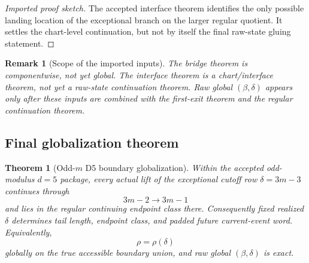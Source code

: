 \documentclass[11pt]{article}
\newtheorem{theorem}{Theorem}
\newtheorem{remark}{Remark}
\begin{document}
\begin{proof}[Imported proof sketch]
The accepted interface theorem identifies the only possible landing location of the exceptional branch on the larger regular quotient.
It settles the chart-level continuation, but not by itself the final raw-state gluing statement.
\end{proof}

\begin{remark}[Scope of the imported inputs]
The bridge theorem is \emph{componentwise}, not yet global.
The interface theorem is a \emph{chart/interface} theorem, not yet a raw-state continuation theorem.
Raw global $(\beta,\delta)$ appears only after these inputs are combined with the first-exit theorem and the regular continuation theorem.
\end{remark}

\subsection{Final globalization theorem}

\begin{theorem}[Odd-$m$ D5 boundary globalization]\label{thm:d5-global}
Within the accepted odd-modulus $d=5$ package, every actual lift of the exceptional cutoff row $\delta=3m-3$ continues through
\[
3m-2 \to 3m-1
\]
and lies in the regular continuing endpoint class there.
Consequently fixed realized $\delta$ determines tail length, endpoint class, and padded future current-event word.
Equivalently,
\[
\rho=\rho(\delta)
\]
globally on the true accessible boundary union, and raw global $(\beta,\delta)$ is exact.
\end{theorem}
\end{document}
